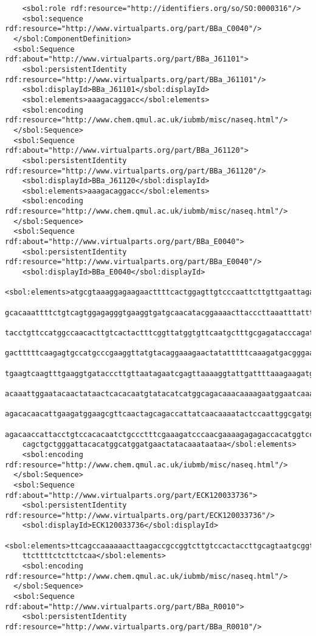 \begin{lstlisting}
    <sbol:role rdf:resource="http://identifiers.org/so/SO:0000316"/>
    <sbol:sequence rdf:resource="http://www.virtualparts.org/part/BBa_C0040"/>
  </sbol:ComponentDefinition>
  <sbol:Sequence rdf:about="http://www.virtualparts.org/part/BBa_J61101">
    <sbol:persistentIdentity rdf:resource="http://www.virtualparts.org/part/BBa_J61101"/>
    <sbol:displayId>BBa_J61101</sbol:displayId>
    <sbol:elements>aaagacaggacc</sbol:elements>
    <sbol:encoding rdf:resource="http://www.chem.qmul.ac.uk/iubmb/misc/naseq.html"/>
  </sbol:Sequence>
  <sbol:Sequence rdf:about="http://www.virtualparts.org/part/BBa_J61120">
    <sbol:persistentIdentity rdf:resource="http://www.virtualparts.org/part/BBa_J61120"/>
    <sbol:displayId>BBa_J61120</sbol:displayId>
    <sbol:elements>aaagacaggacc</sbol:elements>
    <sbol:encoding rdf:resource="http://www.chem.qmul.ac.uk/iubmb/misc/naseq.html"/>
  </sbol:Sequence>
  <sbol:Sequence rdf:about="http://www.virtualparts.org/part/BBa_E0040">
    <sbol:persistentIdentity rdf:resource="http://www.virtualparts.org/part/BBa_E0040"/>
    <sbol:displayId>BBa_E0040</sbol:displayId>
    <sbol:elements>atgcgtaaaggagaagaacttttcactggagttgtcccaattcttgttgaattagatggtgatgttaatgg
    gcacaaattttctgtcagtggagagggtgaaggtgatgcaacatacggaaaacttacccttaaatttatttgcactactggaaaac
    tacctgttccatggccaacacttgtcactactttcggttatggtgttcaatgctttgcgagatacccagatcatatgaaacagcat
    gactttttcaagagtgccatgcccgaaggttatgtacaggaaagaactatatttttcaaagatgacgggaactacaagacacgtgc
    tgaagtcaagtttgaaggtgatacccttgttaatagaatcgagttaaaaggtattgattttaaagaagatggaaacattcttggac
    acaaattggaatacaactataactcacacaatgtatacatcatggcagacaaacaaaagaatggaatcaaagttaacttcaaaatt
    agacacaacattgaagatggaagcgttcaactagcagaccattatcaacaaaatactccaattggcgatggccctgtccttttacc
    agacaaccattacctgtccacacaatctgccctttcgaaagatcccaacgaaaagagagaccacatggtccttcttgagtttgtaa
    cagctgctgggattacacatggcatggatgaactatacaaataataa</sbol:elements>
    <sbol:encoding rdf:resource="http://www.chem.qmul.ac.uk/iubmb/misc/naseq.html"/>
  </sbol:Sequence>
  <sbol:Sequence rdf:about="http://www.virtualparts.org/part/ECK120033736">
    <sbol:persistentIdentity rdf:resource="http://www.virtualparts.org/part/ECK120033736"/>
    <sbol:displayId>ECK120033736</sbol:displayId>
    <sbol:elements>ttcagccaaaaaacttaagaccgccggtcttgtccactaccttgcagtaatgcggtggacaggatcggcggtt
    ttcttttctcttctcaa</sbol:elements>
    <sbol:encoding rdf:resource="http://www.chem.qmul.ac.uk/iubmb/misc/naseq.html"/>
  </sbol:Sequence>
  <sbol:Sequence rdf:about="http://www.virtualparts.org/part/BBa_R0010">
    <sbol:persistentIdentity rdf:resource="http://www.virtualparts.org/part/BBa_R0010"/>

\end{lstlisting}
